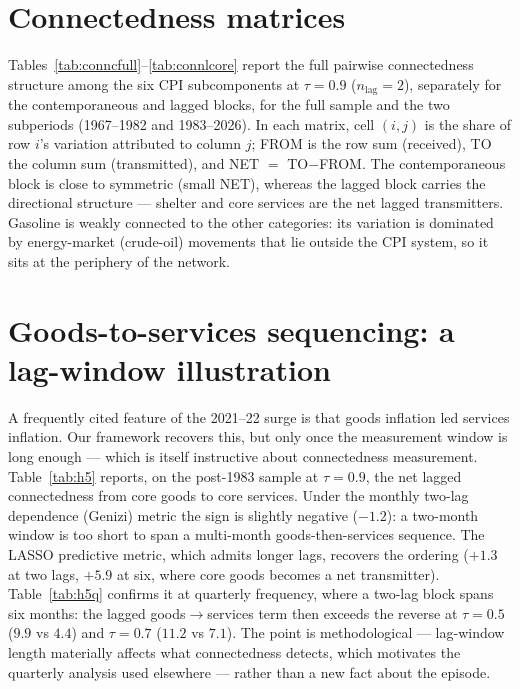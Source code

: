 \documentclass{article}
\begin{document}
 

 


\appendix
\section{Connectedness matrices}
Tables~\ref{tab:conncfull}--\ref{tab:connlcore} report the full pairwise connectedness structure
among the six CPI subcomponents at $\tau=0.9$ ($n_{\text{lag}}=2$), separately for the
contemporaneous and lagged blocks, for the full sample and the two subperiods (1967--1982 and
1983--2026). In each matrix, cell $(i,j)$ is the share of row $i$'s variation attributed to column
$j$; FROM is the row sum (received), TO the column sum (transmitted), and NET $=$ TO$-$FROM. The
contemporaneous block is close to symmetric (small NET), whereas the lagged block carries the
directional structure --- shelter and core services are the net lagged transmitters. Gasoline is
weakly connected to the other categories: its variation is dominated by energy-market (crude-oil)
movements that lie outside the CPI system, so it sits at the periphery of the network.








\section{Goods-to-services sequencing: a lag-window illustration}\label{app:seq}
A frequently cited feature of the 2021--22 surge is that goods inflation led services inflation.
Our framework recovers this, but only once the measurement window is long enough --- which is itself
instructive about connectedness measurement. Table~\ref{tab:h5} reports, on the post-1983 sample at
$\tau=0.9$, the net lagged connectedness from core goods to core services. Under the monthly two-lag
dependence (Genizi) metric the sign is slightly negative ($-1.2$): a two-month window is too short
to span a multi-month goods-then-services sequence. The LASSO predictive metric, which admits longer
lags, recovers the ordering ($+1.3$ at two lags, $+5.9$ at six, where core goods becomes a net
transmitter). Table~\ref{tab:h5q} confirms it at quarterly frequency, where a two-lag block spans
six months: the lagged goods$\to$services term then exceeds the reverse at $\tau=0.5$ ($9.9$ vs
$4.4$) and $\tau=0.7$ ($11.2$ vs $7.1$). The point is methodological --- lag-window length
materially affects what connectedness detects, which motivates the quarterly analysis used elsewhere
--- rather than a new fact about the episode.
\end{document}

